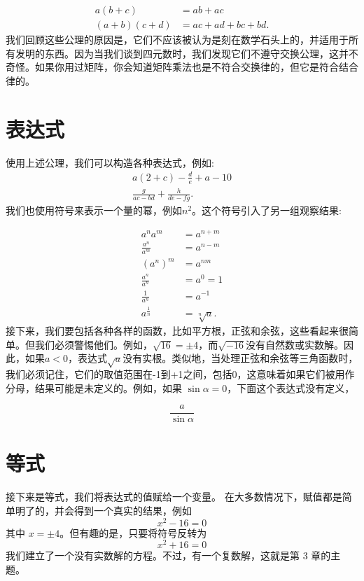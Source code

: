 $$
    \begin{aligned}
        a(b+c)     & =a b+a c           \\
        (a+b)(c+d) & =a c+a d+b c+b d .
    \end{aligned}
$$
我们回顾这些公理的原因是，它们不应该被认为是刻在数学石头上的，并适用于所有发明的东西。因为当我们谈到四元数时，我们发现它们不遵守交换公理，这并不奇怪。如果你用过矩阵，你会知道矩阵乘法也是不符合交换律的，但它是符合结合律的。

\section{表达式}
使用上述公理，我们可以构造各种表达式，例如:
$$
    \begin{gathered}
        a(2+c)-\frac{d}{e}+a-10 \\
        \frac{g}{a c-b d}+\frac{h}{d e-f g} .
    \end{gathered}
$$
我们也使用符号来表示一个量的幂，例如$n^{2}$。这个符号引入了另一组观察结果:

$$
    \begin{aligned}
        a^{n} a^{m}            & =a^{n+m}       \\
        \frac{a^{n}}{a^{m}}    & =a^{n-m}       \\
        \left(a^{n}\right)^{m} & =a^{n m}       \\
        \frac{a^{n}}{a^{n}}    & =a^{0}=1       \\
        \frac{1}{a^{n}}        & =a^{-1}        \\
        a^{\frac{1}{n}}        & =\sqrt[n]{a} .
    \end{aligned}
$$
接下来，我们要包括各种各样的函数，比如平方根，正弦和余弦，这些看起来很简单。但我们必须警惕他们。例如，$\sqrt{16}= \pm 4$，而$\sqrt{-16}$没有自然数或实数解。因此，如果$a<0$，表达式$\sqrt{a}$没有实根。类似地，当处理正弦和余弦等三角函数时，我们必须记住，它们的取值范围在-1到+1之间，包括0，这意味着如果它们被用作分母，结果可能是未定义的。例如，如果 $\sin \alpha=0$，下面这个表达式没有定义，

$$
    \frac{a}{\sin \alpha}
$$

\section{等式}
接下来是等式，我们将表达式的值赋给一个变量。 在大多数情况下，赋值都是简单明了的，并会得到一个真实的结果，例如
$$
    x^{2}-16=0
$$
其中 $x= \pm 4$。但有趣的是，只要将符号反转为
$$
    x^{2}+16=0
$$
我们建立了一个没有实数解的方程。不过，有一个复数解，这就是第 3 章的主题。

